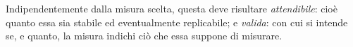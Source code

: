 \documentclass{subfiles}
\begin{document}
Indipendentemente dalla misura scelta, questa deve risultare \emph{attendibile}: cioè quanto essa sia stabile ed eventualmente replicabile;
e \emph{valida}: con cui si intende se, e quanto, la misura indichi ciò che essa suppone di misurare.
\end{document}
